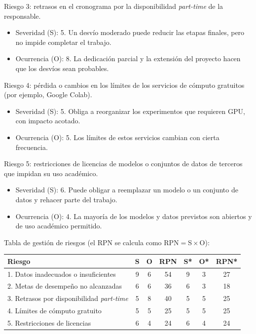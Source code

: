 \documentclass[
11pt, %
]{charter}
\begin{document}
Riesgo 3: retrasos en el cronograma por la disponibilidad \textit{part-time} de la responsable.
\begin{itemize}
	\item Severidad (S): 5. Un desvío moderado puede reducir las etapas finales, pero no impide completar el trabajo.
	\item Ocurrencia (O): 8. La dedicación parcial y la extensión del proyecto hacen que los desvíos sean probables.
\end{itemize}

Riesgo 4: pérdida o cambios en los límites de los servicios de cómputo gratuitos (por ejemplo, Google Colab).
\begin{itemize}
	\item Severidad (S): 5. Obliga a reorganizar los experimentos que requieren GPU, con impacto acotado.
	\item Ocurrencia (O): 5. Los límites de estos servicios cambian con cierta frecuencia.
\end{itemize}

Riesgo 5: restricciones de licencias de modelos o conjuntos de datos de terceros que impidan su uso académico.
\begin{itemize}
	\item Severidad (S): 6. Puede obligar a reemplazar un modelo o un conjunto de datos y rehacer parte del trabajo.
	\item Ocurrencia (O): 4. La mayoría de los modelos y datos previstos son abiertos y de uso académico permitido.
\end{itemize}

\vspace{0.3cm}
Tabla de gestión de riesgos (el RPN se calcula como RPN${}={}$S${}\times{}$O):

\begin{table}[htpb]
\centering
\begin{tabularx}{\linewidth}{@{}|X|c|c|c|c|c|c|@{}}
\hline
\rowcolor[HTML]{C0C0C0}
Riesgo & S & O & RPN & S* & O* & RPN* \\ \hline
1. Datos inadecuados o insuficientes & 9 & 6 & 54 & 9 & 3 & 27 \\ \hline
2. Metas de desempeño no alcanzadas & 6 & 6 & 36 & 6 & 3 & 18 \\ \hline
3. Retrasos por disponibilidad \textit{part-time} & 5 & 8 & 40 & 5 & 5 & 25 \\ \hline
4. Límites de cómputo gratuito & 5 & 5 & 25 & 5 & 5 & 25 \\ \hline
5. Restricciones de licencias & 6 & 4 & 24 & 6 & 4 & 24 \\ \hline
\end{tabularx}%
\end{table}
\end{document}
